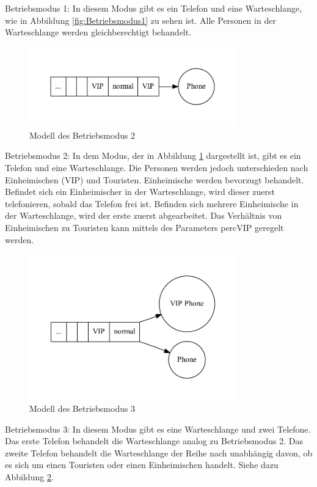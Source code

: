 \begin{list}{}
	\item Betriebsmodus 1: In diesem Modus gibt es ein Telefon und eine Warteschlange, wie in Abbildung \ref{fig:Betriebsmodus1} zu sehen ist. Alle Personen in der Warteschlange werden gleichberechtigt behandelt.
	\begin{figure}[htpb]
		\centering
		\includegraphics[width=0.8\textwidth]{abbildungen/modell/Betriebsmodus_2.pdf}
		\caption{Modell des Betriebsmodus 2}
		\label{fig:Betriebsmodus2}
	\end{figure}
	\item Betriebsmodus 2: In dem Modus, der in Abbildung \ref{fig:Betriebsmodus2} dargestellt ist, gibt es ein Telefon und eine Warteschlange. Die Personen werden jedoch unterschieden nach Einheimischen (VIP) und Touristen. Einheimische werden bevorzugt behandelt. Befindet sich ein Einheimischer in der Warteschlange, wird dieser zuerst telefonieren, sobald das Telefon frei ist. Befinden sich mehrere Einheimische in der Warteschlange, wird der erste zuerst abgearbeitet. Das Verhältnis von Einheimischen zu Touristen kann mittels des Parameters percVIP geregelt werden.
	\begin{figure}[htpb]
		\centering
		\includegraphics[width=0.8\textwidth]{abbildungen/modell/Betriebsmodus_3.pdf}
		\caption{Modell des Betriebsmodus 3}
		\label{fig:Betriebsmodus3}
	\end{figure}
	\item Betriebsmodus 3: In diesem Modus gibt es eine Warteschlange und zwei Telefone. Das erste Telefon behandelt die Warteschlange analog zu Betriebsmodus 2. Das zweite Telefon behandelt die Warteschlange der Reihe nach unabhängig davon, ob es sich um einen Touristen oder einen Einheimischen handelt. Siehe dazu Abbildung \ref{fig:Betriebsmodus3}.
\end{list}

